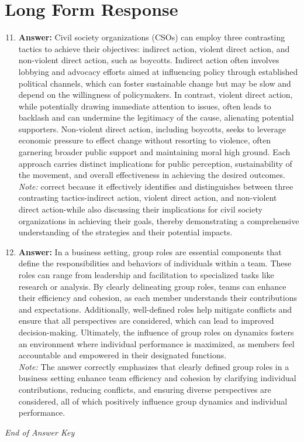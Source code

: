 \documentclass[12pt]{article}
\begin{document}
\section*{Long Form Response}
\begin{enumerate}[label=\arabic*.]
\setcounter{enumi}{10}
\item \textbf{Answer:} Civil society organizations (CSOs) can employ three contrasting tactics to achieve their objectives: indirect action, violent direct action, and non-violent direct action, such as boycotts. Indirect action often involves lobbying and advocacy efforts aimed at influencing policy through established political channels, which can foster sustainable change but may be slow and depend on the willingness of policymakers. In contrast, violent direct action, while potentially drawing immediate attention to issues, often leads to backlash and can undermine the legitimacy of the cause, alienating potential supporters. Non-violent direct action, including boycotts, seeks to leverage economic pressure to effect change without resorting to violence, often garnering broader public support and maintaining moral high ground. Each approach carries distinct implications for public perception, sustainability of the movement, and overall effectiveness in achieving the desired outcomes.
\\ \textit{Note:} correct because it effectively identifies and distinguishes between three contrasting tactics-indirect action, violent direct action, and non-violent direct action-while also discussing their implications for civil society organizations in achieving their goals, thereby demonstrating a comprehensive understanding of the strategies and their potential impacts.
\item \textbf{Answer:} In a business setting, group roles are essential components that define the responsibilities and behaviors of individuals within a team. These roles can range from leadership and facilitation to specialized tasks like research or analysis. By clearly delineating group roles, teams can enhance their efficiency and cohesion, as each member understands their contributions and expectations. Additionally, well-defined roles help mitigate conflicts and ensure that all perspectives are considered, which can lead to improved decision-making. Ultimately, the influence of group roles on dynamics fosters an environment where individual performance is maximized, as members feel accountable and empowered in their designated functions.
\\ \textit{Note:} The answer correctly emphasizes that clearly defined group roles in a business setting enhance team efficiency and cohesion by clarifying individual contributions, reducing conflicts, and ensuring diverse perspectives are considered, all of which positively influence group dynamics and individual performance.
\end{enumerate}

\vfill
\noindent\textit{End of Answer Key}
\end{document}
